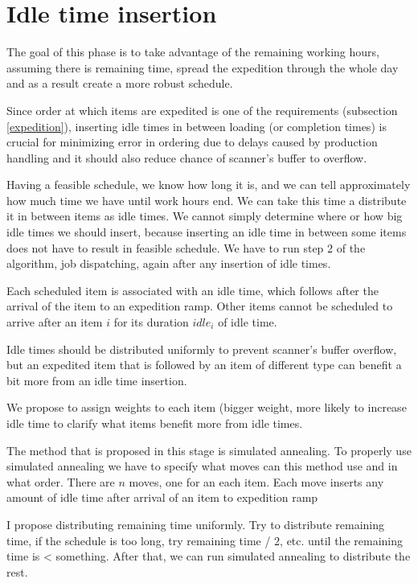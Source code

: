 \documentclass{ctuthesis}
\begin{document}
\section{Idle time insertion}

The goal of this phase is to take advantage of the remaining working hours, assuming there is remaining time, spread the expedition through the whole day and as a result create a more robust schedule. 

Since order at which items are expedited is one of the requirements (subsection \ref{expedition}), inserting idle times in between loading (or completion times) is crucial for minimizing error in ordering due to delays caused by production handling and it should also reduce chance of scanner's buffer to overflow.

Having a feasible schedule, we know how long it is, and we can tell approximately how much time we have until work hours end. We can take this time a distribute it in between items as idle times. We cannot simply determine where or how big idle times we should insert, because inserting an idle time in between some items does not have to result in feasible schedule. We have to run step 2 of the algorithm, job dispatching, again after any insertion of idle times.

Each scheduled item is associated with an idle time, which follows after the arrival of the item to an expedition ramp. Other items cannot be scheduled to arrive after an item $i$ for its duration $idle_i$ of idle time.

Idle times should be distributed uniformly to prevent scanner's buffer overflow, but an expedited item that is followed by an item of different type can benefit a bit more from an idle time insertion. 

We propose to assign weights to each item (bigger weight, more likely to increase idle time to clarify what items benefit more from idle times.

The method that is proposed in this stage is simulated annealing. To properly use simulated annealing we have to specify what moves can this method use and in what order. There are $n$ moves, one for an each item. Each move inserts any amount of idle time after arrival of an item to expedition ramp 


I propose distributing remaining time uniformly. Try to distribute remaining time, if the schedule is too long, try remaining time / 2, etc. until the remaining time is < something. After that, we can run simulated annealing to distribute the rest.
\end{document}
